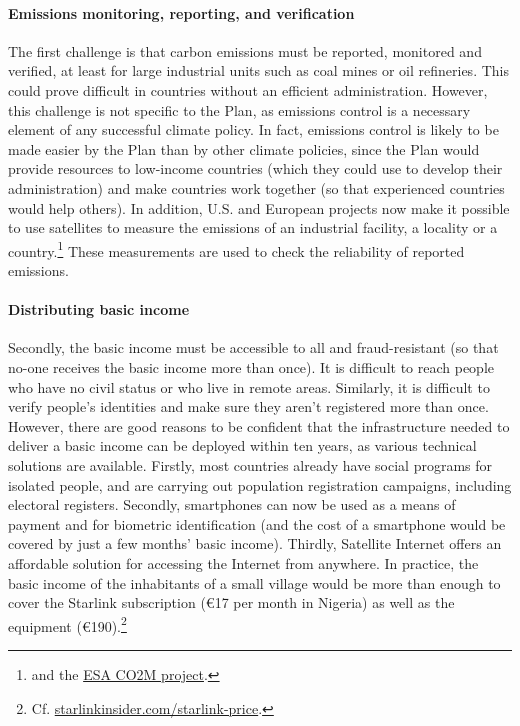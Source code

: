 \documentclass[a5paper,english,openany]{memoir}
\begin{document}
\paragraph{Emissions monitoring, reporting, and verification}
The first challenge is that carbon emissions must be reported, monitored and verified, at least %
for large industrial units such as coal mines or oil refineries. This could prove difficult in countries without an efficient administration. However, this challenge is not specific to the Plan, as emissions control is a necessary element of any successful climate policy. In fact, emissions control is likely to be made easier by the Plan than by other climate policies, since the Plan would provide resources to low-income countries (which they could use to develop their administration) and make countries work together (so that experienced countries would help others). In addition, U.S. and European projects now make it possible to use satellites to measure the emissions of an industrial facility, a locality or a country.\footnote{\citet{pan_potential_2021,shen_national_2023} and the \href{https://www.esa.int/Applications/Observing_the_Earth/Copernicus/Carbon_dioxide_monitoring_satellite_given_the_shakes}{ESA CO2M project}.} These measurements are used to check the reliability of reported emissions.

\paragraph{Distributing basic income}
Secondly, the basic income must be accessible to all and fraud-resistant (so that no-one receives the basic income more than once). It is difficult to reach people who have no civil status or who live in remote areas. Similarly, it is difficult to verify people's identities and make sure they aren't registered more than once. However, there are good reasons to be confident that the infrastructure needed to deliver a basic income can be deployed within ten years, as various technical solutions are available. Firstly, most countries already have social programs for isolated people, and are carrying out population registration campaigns, including electoral registers. %
Secondly, smartphones can now be used as a means of payment and for biometric identification (and the cost of a smartphone would be covered by just a few months' basic income). %
Thirdly, %
Satellite Internet offers an affordable solution for accessing the Internet from anywhere. In practice, the basic income of the inhabitants of a small village would be more than enough to cover the Starlink subscription (\euro{}17 per month in Nigeria) as well as the equipment (\euro{}190).\footnote{Cf. \href{https://starlinkinsider.com/starlink-price/}{starlinkinsider.com/starlink-price}.} %
\end{document}
